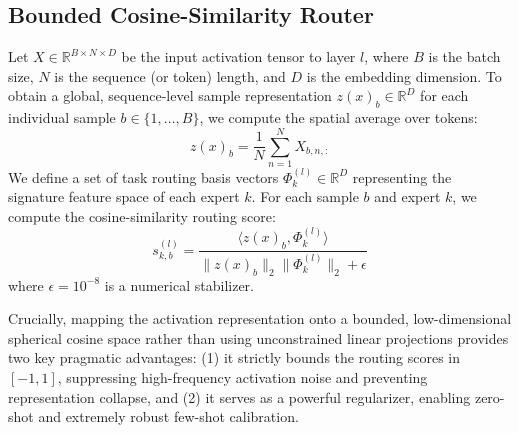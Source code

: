 \subsection{Bounded Cosine-Similarity Router}
Let $X \in \mathbb{R}^{B \times N \times D}$ be the input activation tensor to layer $l$, where $B$ is the batch size, $N$ is the sequence (or token) length, and $D$ is the embedding dimension. To obtain a global, sequence-level sample representation $z(x)_b \in \mathbb{R}^D$ for each individual sample $b \in \{1, \dots, B\}$, we compute the spatial average over tokens:
\begin{equation}
    z(x)_b = \frac{1}{N} \sum_{n=1}^N X_{b, n, :}
\end{equation}
We define a set of task routing basis vectors $\Phi_k^{(l)} \in \mathbb{R}^D$ representing the signature feature space of each expert $k$. For each sample $b$ and expert $k$, we compute the cosine-similarity routing score:
\begin{equation}
    s_{k, b}^{(l)} = \frac{\langle z(x)_b, \Phi_k^{(l)} \rangle}{\|z(x)_b\|_2 \|\Phi_k^{(l)}\|_2 + \epsilon}
\end{equation}
where $\epsilon = 10^{-8}$ is a numerical stabilizer. 

Crucially, mapping the activation representation onto a bounded, low-dimensional spherical cosine space rather than using unconstrained linear projections provides two key pragmatic advantages: (1) it strictly bounds the routing scores in $[-1, 1]$, suppressing high-frequency activation noise and preventing representation collapse, and (2) it serves as a powerful regularizer, enabling zero-shot and extremely robust few-shot calibration.

